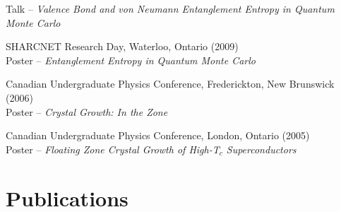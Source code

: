 \documentclass[letterpaper]{article}
\renewenvironment{itemize}{
  \begin{list}{}{
    \setlength{\leftmargin}{1.5em}
  }
}{
  \end{list}
}
\begin{document}
\begin{itemize}
	Talk --  {\it Valence Bond and von Neumann Entanglement Entropy in Quantum Monte Carlo}
\item SHARCNET Research Day, Waterloo, Ontario (2009)  \\
	Poster -- {\it Entanglement Entropy in Quantum Monte Carlo}
\item Canadian Undergraduate Physics Conference, Frederickton, New Brunswick (2006)\\
	Poster -- {\it Crystal Growth: In the Zone}
\item Canadian Undergraduate Physics Conference, London, Ontario (2005)\\
	Poster -- {\it Floating Zone Crystal Growth of High-T$_c$ Superconductors}
\end{itemize}



\section*{Publications}

\end{document}
